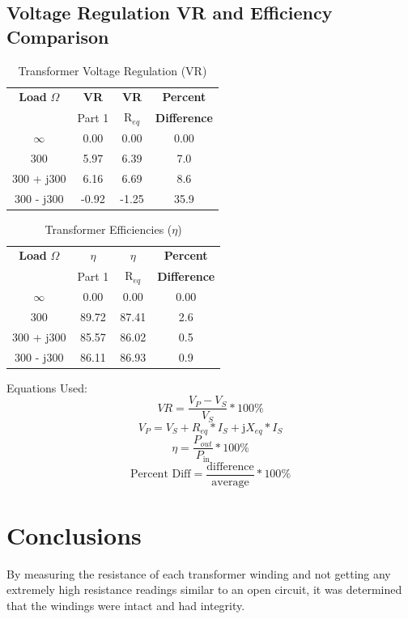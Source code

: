 \documentclass{article}
\begin{document}
\subsection{Voltage Regulation VR and Efficiency Comparison}
\begin{table}[H]
  \centering
  \begin{tabular}{*{4}{c}}
    \textbf{Load} $\Omega$ & \textbf{VR} & \textbf{VR} & \textbf{Percent} \\
    & Part 1 & R$_{eq}$ & \textbf{Difference} \\
    \hline
    $\infty$ & 0.00 & 0.00 & 0.00 \\
    300 & 5.97 & 6.39 & 7.0 \\
    300 + j300 & 6.16 & 6.69 & 8.6 \\
    300 - j300 & -0.92 & -1.25 & 35.9 \\
  \end{tabular}
  \caption{Transformer Voltage Regulation (VR)}
  \label{tab:vr}
\end{table}

\begin{table}[H]
  \centering
  \begin{tabular}{*{4}{c}}
    \textbf{Load} $\Omega$ & $\eta$ & $\eta$ & \textbf{Percent} \\
    & Part 1 & R$_{eq}$ & \textbf{Difference} \\
    \hline
    $\infty$ & 0.00 & 0.00 & 0.00 \\
    300 & 89.72 & 87.41 & 2.6 \\
    300 + j300 & 85.57 & 86.02 & 0.5 \\
    300 - j300 & 86.11 & 86.93 & 0.9 \\
  \end{tabular}
  \caption{Transformer Efficiencies ($\eta$)}
  \label{tab:eff}
\end{table}

Equations Used:
\[VR = \frac{V_P - V_S}{V_S} * 100\%\]
\[V_P = V_S + R_{eq} * I_S + \text{j}X_{eq} * I_S\]
\[\eta = \frac{P_{out}}{P_\text{in}} * 100\% \]
\[\text{Percent Diff} = \frac{\text{difference}}{\text{average}} * 100\%\]

\section{Conclusions}

By measuring the resistance of each transformer winding and not getting any extremely high resistance readings
similar to an open circuit, it was determined that the windings were intact and had integrity.
\end{document}
